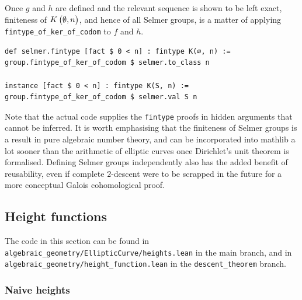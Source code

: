 Once $ g $ and $ h $ are defined and the relevant sequence is shown to be left exact, finiteness of $ K\br{\emptyset, n} $, and hence of all Selmer groups, is a matter of applying \texttt{fintype\_of\_ker\_of\_codom} to $ f $ and $ h $.

\begin{lstlisting}[frame=single]
def selmer.fintype [fact $ 0 < n] : fintype K(∅, n) :=
group.fintype_of_ker_of_codom $ selmer.to_class n

instance [fact $ 0 < n] : fintype K(S, n) := group.fintype_of_ker_of_codom $ selmer.val S n
\end{lstlisting}

Note that the actual code supplies the \texttt{fintype} proofs in hidden arguments that cannot be inferred. It is worth emphasising that the finiteness of Selmer groups is a result in pure algebraic number theory, and can be incorporated into mathlib a lot sooner than the arithmetic of elliptic curves once Dirichlet's unit theorem is formalised. Defining Selmer groups independently also has the added benefit of reusability, even if complete $ 2 $-descent were to be scrapped in the future for a more conceptual Galois cohomological proof.

\pagebreak

\subsection{Height functions}

The code in this section can be found in \texttt{algebraic\_geometry/EllipticCurve/heights.lean} in the main branch, and in \texttt{algebraic\_geometry/height\_function.lean} in the \texttt{descent\_theorem} branch.

\subsubsection{Naive heights}

